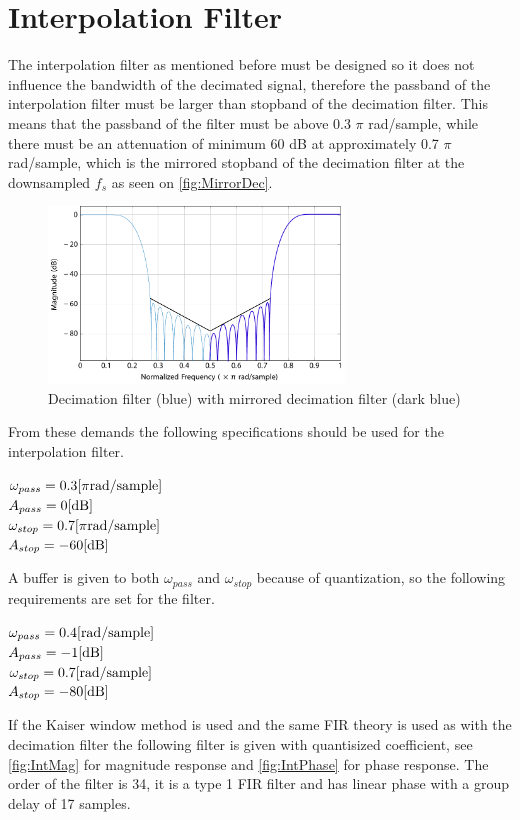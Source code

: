 \section{Interpolation Filter} \label{sec:IntFilter}
The interpolation filter as mentioned before must be designed so it does not influence the bandwidth of the decimated signal, therefore the passband of the interpolation filter must be larger than stopband of the decimation filter. This means that the passband of the filter must be above 0.3 $\pi$ rad/sample, while there must be an attenuation of minimum 60 dB at approximately 0.7 $\pi$ rad/sample, which is the mirrored stopband of the decimation filter at the downsampled $f_s$ as seen on \autoref{fig:MirrorDec}. 

\begin{figure}[H]
\centering
	\includegraphics[width=0.7\textwidth]{figures/DecIntCompMirror}
\caption{Decimation filter (blue) with mirrored decimation filter (dark blue)}
\label{fig:MirrorDec}
\end{figure}

From these demands the following specifications should be used for the interpolation filter.

$\omega_{pass}=0.3 \enhed{\pi rad/sample}$\\
$A_{pass}=0 \enhed{dB}$\\
$\omega_{stop}=0.7 \enhed{\pi rad/sample}$\\
$A_{stop}=-60 \enhed{dB}$

A buffer is given to both $\omega_{pass}$ and $\omega_{stop}$ because of quantization, so the following requirements are set for the filter.

$\omega_{pass}=0.4 \enhed{rad/sample}$\\
$A_{pass}=-1 \enhed{dB}$\\
$\omega_{stop}=0.7 \enhed{rad/sample}$\\
$A_{stop}=-80 \enhed{dB}$

If the Kaiser window method is used and the same FIR theory is used as with the decimation filter the following filter is given with quantisized coefficient, see \autoref{fig:IntMag} for magnitude response and \autoref{fig:IntPhase} for phase response. The order of the filter is 34, it is a type 1 FIR filter and has linear phase with a group delay of 17 samples.

